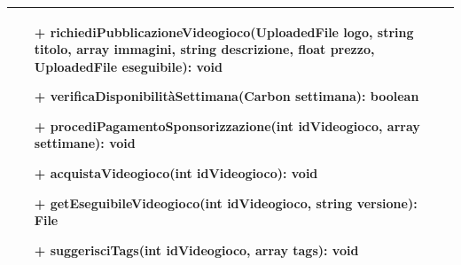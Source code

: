 \begin{tabular}{|| l | p{28em} ||}
\begin{itemize}
		\item[+] richiediPubblicazioneVideogioco(UploadedFile logo, string titolo, array immagini, string descrizione, float prezzo, UploadedFile eseguibile): void
		\item[+] verificaDisponibilitàSettimana(Carbon settimana): boolean
		\item[+] procediPagamentoSponsorizzazione(int idVideogioco, array settimane): void
		\item[+] acquistaVideogioco(int idVideogioco): void
		\item[+] getEseguibileVideogioco(int idVideogioco, string versione): File
		\item[+] suggerisciTags(int idVideogioco, array tags): void
	\end{itemize}\\
	\hline
\end{tabular}

\newpage
